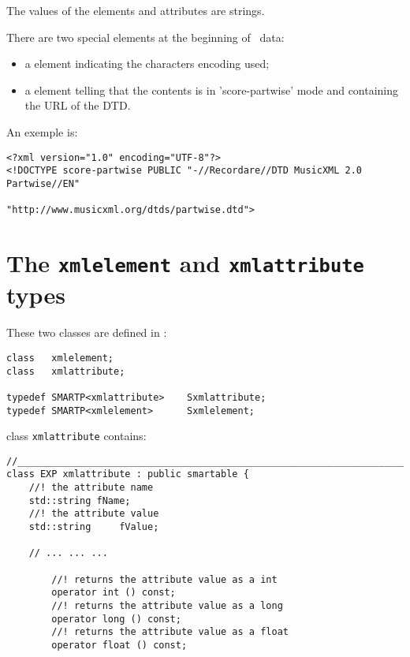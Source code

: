The values of the elements and attributes are strings.

There are two special elements at the beginning of \mxml\ data:
\begin{itemize}
\item a  element indicating the characters encoding used;
\item a  element telling that the contents is in ’score-partwise’ mode and containing the URL of the DTD.
\end{itemize}

An exemple is:
\begin{lstlisting}[language=MusicXML]
<?xml version="1.0" encoding="UTF-8"?>
<!DOCTYPE score-partwise PUBLIC "-//Recordare//DTD MusicXML 2.0 Partwise//EN"
                                "http://www.musicxml.org/dtds/partwise.dtd">
\end{lstlisting}


\section{The {\tt xmlelement} and {\tt xmlattribute} types}

These two classes are defined in :
\begin{lstlisting}[language=CPlusPlus]
class   xmlelement;
class   xmlattribute;

typedef SMARTP<xmlattribute> 	Sxmlattribute;
typedef SMARTP<xmlelement> 		Sxmlelement;
\end{lstlisting}

class   {\tt xmlattribute} contains:
\begin{lstlisting}[language=CPlusPlus]
//______________________________________________________________________________
class EXP xmlattribute : public smartable {
	//! the attribute name
	std::string	fName;
	//! the attribute value
	std::string 	fValue;

	// ... ... ...

		//! returns the attribute value as a int
		operator int () const;
		//! returns the attribute value as a long
		operator long () const;
		//! returns the attribute value as a float
		operator float () const;
\end{lstlisting}

